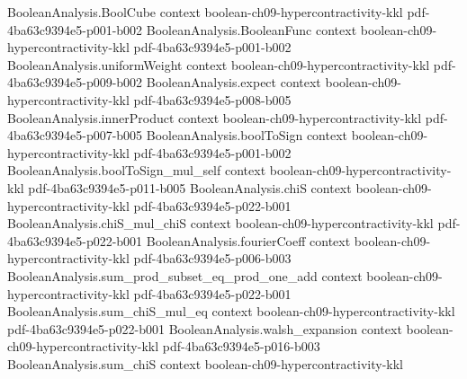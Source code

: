 \begin{theorem}
\leanok
{}
\label{BooleanAnalysis.Hypercontractivity.hypercontractivity_p_2_general}
\proofstep
  {BooleanAnalysis.BoolCube}
  {context}
  {boolean-ch09-hypercontractivity-kkl}
  {pdf-4ba63c9394e5-p001-b002}
\proofstep
  {BooleanAnalysis.BooleanFunc}
  {context}
  {boolean-ch09-hypercontractivity-kkl}
  {pdf-4ba63c9394e5-p001-b002}
\proofstep
  {BooleanAnalysis.uniformWeight}
  {context}
  {boolean-ch09-hypercontractivity-kkl}
  {pdf-4ba63c9394e5-p009-b002}
\proofstep
  {BooleanAnalysis.expect}
  {context}
  {boolean-ch09-hypercontractivity-kkl}
  {pdf-4ba63c9394e5-p008-b005}
\proofstep
  {BooleanAnalysis.innerProduct}
  {context}
  {boolean-ch09-hypercontractivity-kkl}
  {pdf-4ba63c9394e5-p007-b005}
\proofstep
  {BooleanAnalysis.boolToSign}
  {context}
  {boolean-ch09-hypercontractivity-kkl}
  {pdf-4ba63c9394e5-p001-b002}
\proofstep
  {BooleanAnalysis.boolToSign_mul_self}
  {context}
  {boolean-ch09-hypercontractivity-kkl}
  {pdf-4ba63c9394e5-p011-b005}
\proofstep
  {BooleanAnalysis.chiS}
  {context}
  {boolean-ch09-hypercontractivity-kkl}
  {pdf-4ba63c9394e5-p022-b001}
\proofstep
  {BooleanAnalysis.chiS_mul_chiS}
  {context}
  {boolean-ch09-hypercontractivity-kkl}
  {pdf-4ba63c9394e5-p022-b001}
\proofstep
  {BooleanAnalysis.fourierCoeff}
  {context}
  {boolean-ch09-hypercontractivity-kkl}
  {pdf-4ba63c9394e5-p006-b003}
\proofstep
  {BooleanAnalysis.sum_prod_subset_eq_prod_one_add}
  {context}
  {boolean-ch09-hypercontractivity-kkl}
  {pdf-4ba63c9394e5-p022-b001}
\proofstep
  {BooleanAnalysis.sum_chiS_mul_eq}
  {context}
  {boolean-ch09-hypercontractivity-kkl}
  {pdf-4ba63c9394e5-p022-b001}
\proofstep
  {BooleanAnalysis.walsh_expansion}
  {context}
  {boolean-ch09-hypercontractivity-kkl}
  {pdf-4ba63c9394e5-p016-b003}
\proofstep
  {BooleanAnalysis.sum_chiS}
  {context}
  {boolean-ch09-hypercontractivity-kkl}

\end{theorem}
